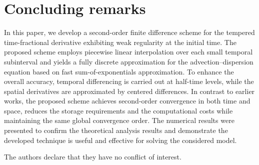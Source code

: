 \documentclass[10pt, reqno]{amsart}
\theoremstyle{remark}
\theoremstyle{definition}
\numberwithin{table}{section}
\begin{document}
\section{Concluding remarks}\label{section5}
In this paper, we develop a second-order finite difference scheme for the tempered time-fractional derivative exhibiting weak regularity at the initial time. The proposed scheme employs piecewise linear interpolation over each small temporal subinterval and yields a fully discrete approximation for the advection–dispersion equation based on fast sum-of-exponentials approximation. To enhance the overall accuracy, temporal differencing is carried out at half-time levels, while the spatial derivatives are approximated by centered differences. In contrast to earlier works, the proposed scheme achieves second-order convergence in both time and space, reduces the storage requirements and the computational costs while maintaining the
same global convergence order. The numerical results were presented to confirm the theoretical analysis results and demonstrate the developed technique is useful and effective for solving the considered model.
\vspace{18pt}


\vspace{12pt}

\;\;
 The authors declare that they have no conflict of interest. 


\vspace{18pt}
\end{document}
